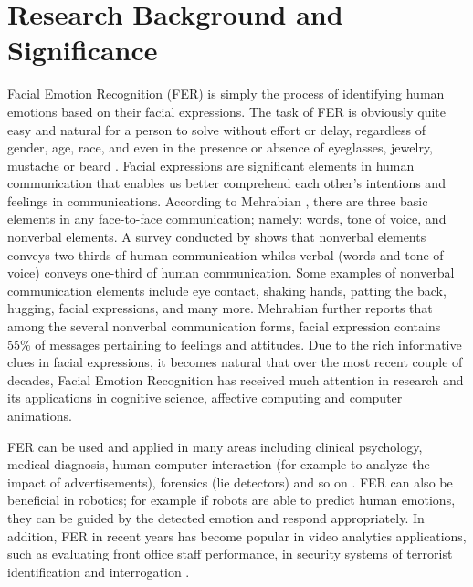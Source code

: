 \documentclass[master]{thesis-uestc}
\begin{document}
\section{Research Background and Significance}
Facial Emotion Recognition (FER) is simply the process of identifying human emotions based on their facial expressions. The task of FER is obviously quite easy and natural for a person to solve without effort or delay, regardless of gender, age, race, and even in the presence or absence of eyeglasses, jewelry, mustache or beard \cite{Ivanovsky-2017}. Facial expressions are significant elements in human communication that enables us better comprehend each other’s intentions and feelings in communications. According to Mehrabian \cite{albert1968}, there are three basic elements in any face-to-face communication; namely: words, tone of voice, and nonverbal elements. A survey conducted by \cite{albert1968} shows that nonverbal elements conveys two-thirds of human communication whiles verbal (words and tone of voice) conveys one-third of human communication. Some examples of nonverbal communication elements include eye contact, shaking hands, patting the back, hugging, facial expressions, and many more. Mehrabian\cite{albert1968} further reports that among the several nonverbal communication forms, facial expression contains 55\% of messages pertaining to feelings and attitudes. Due to the rich informative clues in facial expressions, it becomes natural that over the most recent couple of decades, Facial Emotion Recognition has received much attention in research and its applications in cognitive science, affective computing and computer animations.

FER can be used and applied in many areas including clinical psychology, medical diagnosis, human computer interaction (for example to analyze the impact of advertisements), forensics (lie detectors) and so on \cite{Ivanovsky-2017}\cite{sang-2017}. FER can also be beneficial in robotics; for example if robots are able to predict human emotions, they can be guided by the detected emotion and respond appropriately. In addition, FER in recent years has become popular in video analytics applications, such as evaluating front office staff performance, in security systems of terrorist identification and interrogation \cite{sang-2017}.
\end{document}
